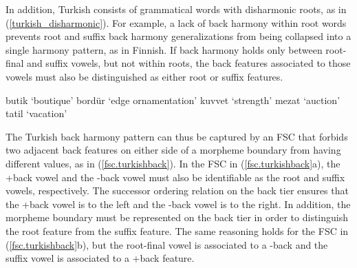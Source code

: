 \documentclass[,doc,floatsintext]{apa6}
\theoremstyle{definition}
\theoremstyle{definition}
\theoremstyle{definition}
\theoremstyle{remark}
\begin{document}
In addition, Turkish consists of grammatical words with disharmonic
roots, as in (\ref{turkish_disharmonic}). For example, a lack of back
harmony within root words prevents root and suffix back harmony
generalizations from being collapsed into a single harmony pattern, as
in Finnish. If back harmony holds only between root-final and suffix
vowels, but not within roots, the back features associated to those
vowels must also be distinguished as either root or suffix features.

\begin{exe}
\label{turkish_disharmonic} 
\begin{xlist}
  \ex butik   `boutique'
  \ex bordür  `edge ornamentation'
  \ex kuvvet  `strength'
  \ex mezat   `auction'
  \ex tatil   `vacation'
\end{xlist}
\end{exe}

The Turkish back harmony pattern can thus be captured by an FSC that
forbids two adjacent back features on either side of a morpheme boundary
from having different values, as in (\ref{fsc.turkishback}). In the FSC
in (\ref{fsc.turkishback}a), the +back vowel and the -back vowel must
also be identifiable as the root and suffix vowels, respectively. The
successor ordering relation on the back tier ensures that the +back
vowel is to the left and the -back vowel is to the right. In addition,
the morpheme boundary must be represented on the back tier in order to
distinguish the root feature from the suffix feature. The same reasoning
holds for the FSC in (\ref{fsc.turkishback}b), but the root-final vowel
is associated to a -back and the suffix vowel is associated to a +back
feature.

\begin{exe}
\ex \label{fsc.turkishback}
\end{exe}
\end{document}
